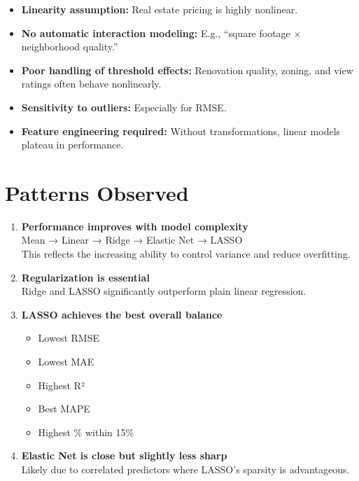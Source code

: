 \documentclass[
  english,
  letterpaper,
  DIV=11,
  numbers=noendperiod]{scrreprt}
\providecommand{\tightlist}{%
  \setlength{\itemsep}{0pt}\setlength{\parskip}{0pt}}
\begin{document}
\begin{itemize}
\tightlist
\item
  \textbf{Linearity assumption:} Real estate pricing is highly
  nonlinear.\\
\item
  \textbf{No automatic interaction modeling:} E.g., ``square footage ×
  neighborhood quality.''\\
\item
  \textbf{Poor handling of threshold effects:} Renovation quality,
  zoning, and view ratings often behave nonlinearly.\\
\item
  \textbf{Sensitivity to outliers:} Especially for RMSE.\\
\item
  \textbf{Feature engineering required:} Without transformations, linear
  models plateau in performance.
\end{itemize}

\section{Patterns Observed}\label{patterns-observed}

\begin{enumerate}
\def\labelenumi{\arabic{enumi}.}
\item
  \textbf{Performance improves with model complexity}\\
  Mean → Linear → Ridge → Elastic Net → LASSO\\
  This reflects the increasing ability to control variance and reduce
  overfitting.
\item
  \textbf{Regularization is essential}\\
  Ridge and LASSO significantly outperform plain linear regression.
\item
  \textbf{LASSO achieves the best overall balance}

  \begin{itemize}
  \tightlist
  \item
    Lowest RMSE
  \item
    Lowest MAE
  \item
    Highest R²
  \item
    Best MAPE
  \item
    Highest \% within 15\%
  \end{itemize}
\item
  \textbf{Elastic Net is close but slightly less sharp}\\
  Likely due to correlated predictors where LASSO's sparsity is
  advantageous.
\end{enumerate}
\end{document}

